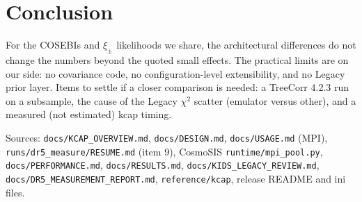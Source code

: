 \documentclass[10pt,a4paper]{article}
\newcommand{\file}[1]{{\small\texttt{#1}}}
\begin{document}
\section{Conclusion}
For the COSEBIs and $\xi_\pm$ likelihoods we share, the architectural differences do not change the numbers beyond the quoted small effects. The practical limits are on our side: no covariance code, no configuration-level extensibility, and no Legacy prior layer. Items to settle if a closer comparison is needed: a TreeCorr 4.2.3 run on a subsample, the cause of the Legacy $\chi^2$ scatter (emulator versus other), and a measured (not estimated) kcap timing.

\vspace{4pt}\footnotesize\sloppy
Sources: \file{docs/KCAP\_OVERVIEW.md}, \file{docs/DESIGN.md}, \file{docs/USAGE.md} (MPI), \file{runs/dr5\_measure/RESUME.md} (item 9), CosmoSIS \file{runtime/mpi\_pool.py}, \file{docs/PERFORMANCE.md}, \file{docs/RESULTS.md}, \file{docs/KIDS\_LEGACY\_REVIEW.md}, \file{docs/DR5\_MEASUREMENT\_REPORT.md}, \file{reference/kcap}, release README and ini files.
\end{document}
